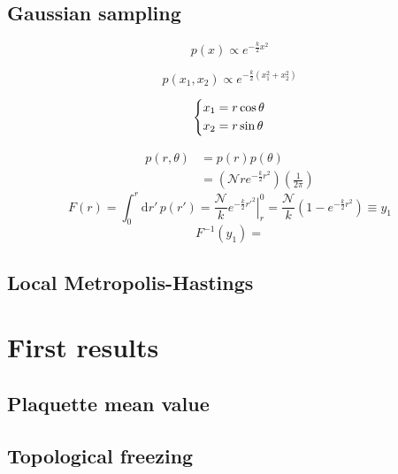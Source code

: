 \subsection*{Gaussian sampling}
\[
    p(x) \propto e^{-\frac{k}{2}x^2}
\]

\[
    p(x_1,x_2) \propto e^{-\frac{k}{2}(x_1^2+x_2^2)}
\]

\[\begin{dcases}
    x_1 = r \cos\theta \\
    x_2 = r \sin\theta \\
\end{dcases}\]

\[\begin{aligned}
    p(r,\theta) &= p(r)p(\theta) \\
                &= \left(\mathcal Nre^{-\frac{k}{2}r^2}\right)\left(\frac{1}{2\pi}\right)
\end{aligned}\]
\[
    F(r) = \int_0^r\mathrm dr'\,p(r') = \frac{\mathcal N}{k}\left.e^{-\frac{k}{2}{r'}^2}\right|_r^0 = \frac{\mathcal N}{k}\left(1-e^{-\frac{k}{2}r^2}\right) \equiv y_1
\]
\[
    F^{-1}(y_1) = 
\]

\subsection{Local Metropolis-Hastings}

\section{First results}

\subsection{Plaquette mean value}

\subsection{Topological freezing}

